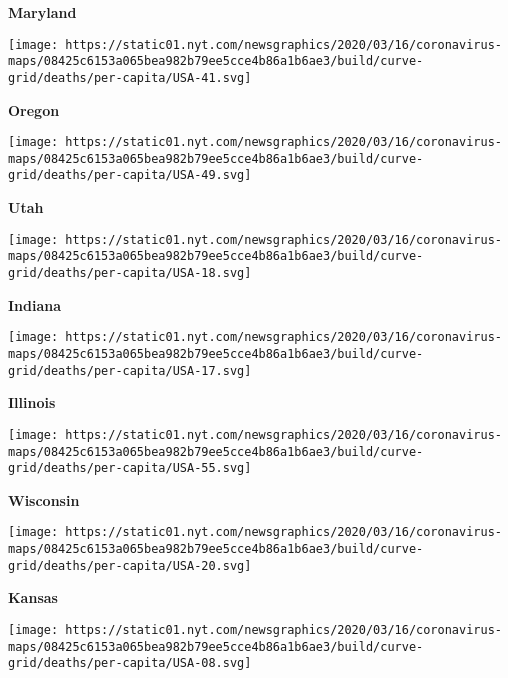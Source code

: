 \textbf{Maryland}

\href{https://www.nytimes.com/interactive/2020/us/oregon-coronavirus-cases.html}{}

\texttt{[image: https://static01.nyt.com/newsgraphics/2020/03/16/coronavirus-maps/08425c6153a065bea982b79ee5cce4b86a1b6ae3/build/curve-grid/deaths/per-capita/USA-41.svg]}

\textbf{Oregon}

\href{https://www.nytimes.com/interactive/2020/us/utah-coronavirus-cases.html}{}

\texttt{[image: https://static01.nyt.com/newsgraphics/2020/03/16/coronavirus-maps/08425c6153a065bea982b79ee5cce4b86a1b6ae3/build/curve-grid/deaths/per-capita/USA-49.svg]}

\textbf{Utah}

\href{https://www.nytimes.com/interactive/2020/us/indiana-coronavirus-cases.html}{}

\texttt{[image: https://static01.nyt.com/newsgraphics/2020/03/16/coronavirus-maps/08425c6153a065bea982b79ee5cce4b86a1b6ae3/build/curve-grid/deaths/per-capita/USA-18.svg]}

\textbf{Indiana}

\href{https://www.nytimes.com/interactive/2020/us/illinois-coronavirus-cases.html}{}

\texttt{[image: https://static01.nyt.com/newsgraphics/2020/03/16/coronavirus-maps/08425c6153a065bea982b79ee5cce4b86a1b6ae3/build/curve-grid/deaths/per-capita/USA-17.svg]}

\textbf{Illinois}

\href{https://www.nytimes.com/interactive/2020/us/wisconsin-coronavirus-cases.html}{}

\texttt{[image: https://static01.nyt.com/newsgraphics/2020/03/16/coronavirus-maps/08425c6153a065bea982b79ee5cce4b86a1b6ae3/build/curve-grid/deaths/per-capita/USA-55.svg]}

\textbf{Wisconsin}

\href{https://www.nytimes.com/interactive/2020/us/kansas-coronavirus-cases.html}{}

\texttt{[image: https://static01.nyt.com/newsgraphics/2020/03/16/coronavirus-maps/08425c6153a065bea982b79ee5cce4b86a1b6ae3/build/curve-grid/deaths/per-capita/USA-20.svg]}

\textbf{Kansas}

\href{https://www.nytimes.com/interactive/2020/us/colorado-coronavirus-cases.html}{}

\texttt{[image: https://static01.nyt.com/newsgraphics/2020/03/16/coronavirus-maps/08425c6153a065bea982b79ee5cce4b86a1b6ae3/build/curve-grid/deaths/per-capita/USA-08.svg]}

